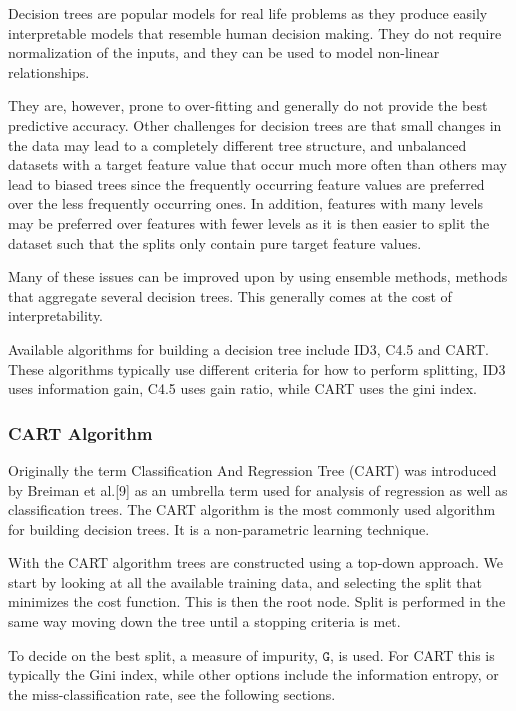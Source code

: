 \documentclass[11pt]{article}
\begin{document}
Decision trees are popular models for real life problems as they produce
easily interpretable models that resemble human decision making. They do
not require normalization of the inputs, and they can be used to model
non-linear relationships.

They are, however, prone to over-fitting and generally do not provide the
best predictive accuracy. Other challenges for decision trees are that
small changes in the data may lead to a completely different tree
structure, and unbalanced datasets with a target feature value that
occur much more often than others may lead to biased trees since
the frequently occurring feature values are preferred over the less
frequently occurring ones. In addition, features with many levels may be
preferred over features with fewer levels as it is then easier to split
the dataset such that the splits only contain pure target feature
values.

Many of these issues can be improved upon by using ensemble methods,
methods that aggregate several decision trees. This generally comes at
the cost of interpretability.

Available algorithms for building a decision tree include ID3, C4.5 and
CART. These algorithms typically use different criteria for how to
perform splitting, ID3 uses information gain, C4.5 uses gain ratio,
while CART uses the gini index. 

    \hypertarget{cart-algorithm}{%
	\subsubsection{CART Algorithm}\label{cart-algorithm}}
 Originally the term Classification And Regression Tree (CART) was introduced by Breiman
et al.{[}9{]} as an umbrella term used for analysis of regression as well
as classification trees. The CART algorithm is the most commonly used
algorithm for building decision trees. It is a non-parametric learning
technique.

With the CART algorithm trees are constructed using a top-down approach.
We start by looking at all the available training data, and selecting
the split that minimizes the cost function. This is then the root node.
Split is performed in the same way moving down the tree until a stopping
criteria is met.

To decide on the best split, a measure of impurity, \(\texttt{G}\), is
used. For CART this is typically the Gini index, while other options
include the information entropy, or the miss-classification rate, see the
following sections.
\end{document}

